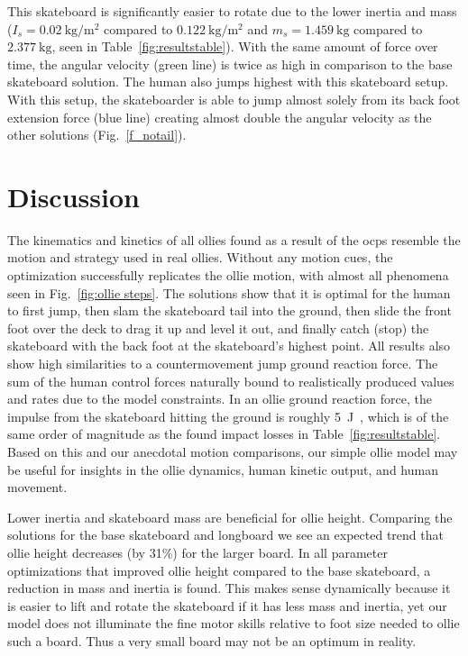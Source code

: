 \documentclass[default,iicol]{sn-jnl}
\begin{document}
This skateboard is significantly easier to rotate due to the lower inertia and mass ($I_s = \SI{0.02}{\kilo\gram\per\meter\squared}$ compared to $\SI{0.122}{\kilo\gram\per\meter\squared}$ and $m_s = \SI{1.459}{\kilo\gram}$ compared to $\SI{2.377}{\kilo\gram}$, seen in Table~\ref{fig:resultstable}).
With the same amount of force over time, the angular velocity (green line) is twice as high in comparison to the base skateboard solution.
The human also jumps highest with this skateboard setup.
With this setup, the skateboarder is able to jump almost solely from its back foot extension force (blue line) creating almost double the angular velocity as the other solutions (Fig.~\ref{f_notail}).

\section{Discussion}
The kinematics and kinetics of all ollies found as a result of the \glspl{ocp} resemble the motion and strategy used in real ollies.
Without any motion cues, the optimization successfully replicates the ollie motion, with almost all phenomena seen in Fig.~\ref{fig:ollie steps}.
The solutions show that it is optimal for the human to first jump, then slam the skateboard tail into the ground, then slide the front foot over the deck to drag it up and level it out, and finally catch (stop) the skateboard with the back foot at the skateboard's highest point.
All results also show high similarities to a countermovement jump ground reaction force.
The sum of the human control forces naturally bound to realistically produced values and rates due to the model constraints.
In an ollie ground reaction force, the impulse from the skateboard hitting the ground is roughly \SI{5}{\joule}~\cite{determan_kinetics_2006}, which is of the same order of magnitude as the found impact losses in Table~\ref{fig:resultstable}.
Based on this and our anecdotal motion comparisons, our simple ollie model may be useful for insights in the ollie dynamics, human kinetic output, and human movement.

Lower inertia and skateboard mass are beneficial for ollie height.
Comparing the solutions for the base skateboard and longboard we see an expected trend that ollie height decreases (by 31\%) for the larger board.
In all parameter optimizations that improved ollie height compared to the base skateboard, a reduction in mass and inertia is found.
This makes sense dynamically because it is easier to lift and rotate the skateboard if it has less mass and inertia, yet our model does not illuminate the fine motor skills relative to foot size needed to ollie such a board. Thus a very small board may not be an optimum in reality.
\end{document}
